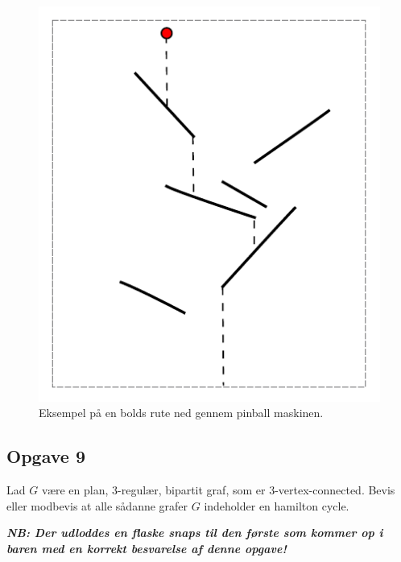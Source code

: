 \begin{figure}[h!]
    \centering
    \includegraphics[width=0.7\linewidth]{figures/pinball.pdf}
    \caption{Eksempel på en bolds rute ned gennem pinball maskinen.}
    \label{fig:pinball}
\end{figure}

\newpage
\subsection{Opgave 9}

Lad $G$ være en plan, 3-regulær, bipartit graf, som er 3-vertex-connected.
Bevis eller modbevis at alle sådanne grafer $G$ indeholder en hamilton cycle.

\vspace{.1in}
\textbf{\emph{NB: Der udloddes en flaske snaps til den første som kommer op i baren med en korrekt besvarelse af denne opgave!}}


